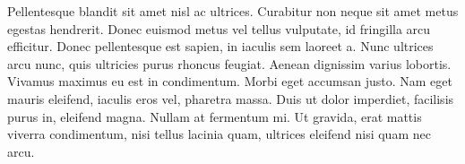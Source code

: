 Pellentesque blandit sit amet nisl ac ultrices. Curabitur non neque sit amet metus egestas hendrerit. Donec euismod metus vel tellus vulputate, id fringilla arcu efficitur. Donec pellentesque est sapien, in iaculis sem laoreet a. Nunc ultrices arcu nunc, quis ultricies purus rhoncus feugiat. Aenean dignissim varius lobortis. Vivamus maximus eu est in condimentum. Morbi eget accumsan justo. Nam eget mauris eleifend, iaculis eros vel, pharetra massa. Duis ut dolor imperdiet, facilisis purus in, eleifend magna. Nullam at fermentum mi. Ut gravida, erat mattis viverra condimentum, nisi tellus lacinia quam, ultrices eleifend nisi quam nec arcu.